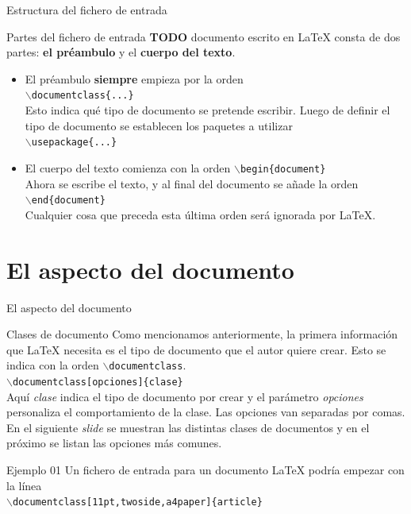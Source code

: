 \documentclass[10pt]{beamer}
\begin{document}
\begin{frame}{Estructura del fichero de entrada}
	\begin{block}{Partes del fichero de entrada}
	\textbf{TODO} documento escrito en \LaTeX{} consta de dos partes: \textbf{el préambulo} y el \textbf{cuerpo del texto}.
	\begin{itemize}
	\item El préambulo \textbf{siempre} empieza por la orden \\
	\texttt{$\backslash$documentclass\{...\}} \\
	Esto indica qué tipo de documento se pretende escribir. Luego de definir el tipo de documento se establecen los paquetes a utilizar \\
	\texttt{$\backslash$usepackage\{...\}}
	\item El cuerpo del texto comienza con la orden
	\texttt{$\backslash$begin\{document\}} \\
	Ahora se escribe el texto, y al final del documento se añade la orden \\
\texttt{$\backslash$end\{document\}}\\
Cualquier cosa que preceda esta última orden será ignorada por \LaTeX{}.
	\end{itemize}
	\end{block}
\end{frame}

\section{El aspecto del documento}

\begin{frame}{El aspecto del documento}
	\begin{block}{Clases de documento}
		Como mencionamos anteriormente, la primera información que \LaTeX{} necesita es el tipo de documento que el autor quiere crear. Esto se indica con la orden \texttt{$\backslash$documentclass}.\\
		\texttt{$\backslash$documentclass[opciones]\{clase\}} \\
		Aquí \emph{clase} indica el tipo de documento por crear y el parámetro \emph{opciones} personaliza el comportamiento de la clase. Las opciones van separadas por comas. En el siguiente \textit{slide} se muestran las distintas clases de documentos y en el próximo se listan las opciones más comunes. \\
	\end{block}

	\begin{exampleblock}{Ejemplo 01}
	Un fichero de entrada para un documento \LaTeX{} podría empezar con la línea\\
	\texttt{$\backslash$documentclass[11pt,twoside,a4paper]\{article\}}
	\end{exampleblock}			
\end{frame}
\end{document}
